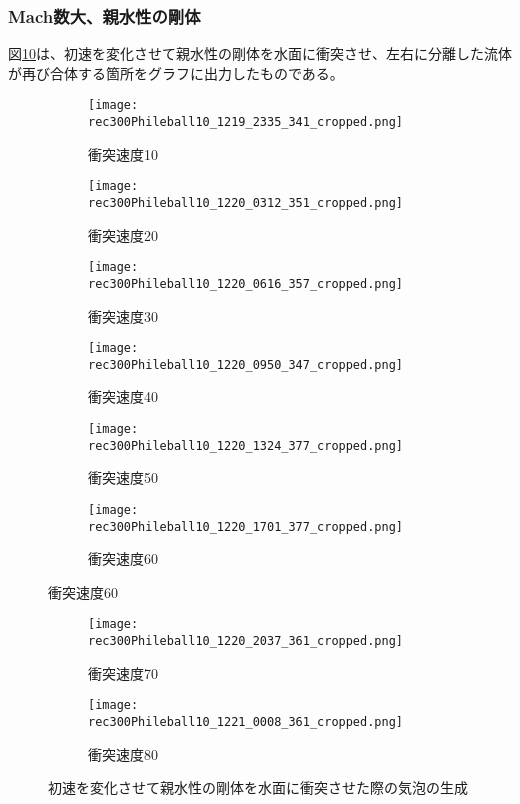 \documentclass[]{jsarticle}
\begin{document}
\subsubsection{Mach数大、親水性の剛体}
図\ref{fig:hydrophilic}は、初速を変化させて親水性の剛体を水面に衝突させ、左右に分離した流体が再び合体する箇所をグラフに出力したものである。
\begin{figure}[H]
  \centering
\begin{subfigure}{0.3\columnwidth}
  \centering
  \texttt{[image: rec300Phileball10\_1219\_2335\_341\_cropped.png]}
  \caption{衝突速度10}
  \label{fig:philevel10}
\end{subfigure}
\begin{subfigure}{0.3\columnwidth}
  \centering
  \texttt{[image: rec300Phileball10\_1220\_0312\_351\_cropped.png]}
  \caption{衝突速度20}
  \label{fig:philevel20}
\end{subfigure}
\begin{subfigure}{0.3\columnwidth}
  \centering
  \texttt{[image: rec300Phileball10\_1220\_0616\_357\_cropped.png]}
  \caption{衝突速度30}
  \label{fig:philevel30}
\end{subfigure}
\begin{subfigure}{0.3\columnwidth}
  \centering
  \texttt{[image: rec300Phileball10\_1220\_0950\_347\_cropped.png]}
  \caption{衝突速度40}
  \label{fig:philevel40}
\end{subfigure}
\begin{subfigure}{0.3\columnwidth}
  \centering
  \texttt{[image: rec300Phileball10\_1220\_1324\_377\_cropped.png]}
  \caption{衝突速度50}
  \label{fig:philevel50}
\end{subfigure}
\begin{subfigure}{0.3\columnwidth}
  \centering
  \texttt{[image: rec300Phileball10\_1220\_1701\_377\_cropped.png]}
  \caption{衝突速度60}
  \label{fig:philevel60}
\end{subfigure}
\end{figure}
\clearpage
\begin{figure}
\ContinuedFloat
  \begin{subfigure}{0.3\columnwidth}
  \centering
  \texttt{[image: rec300Phileball10\_1220\_2037\_361\_cropped.png]}
  \caption{衝突速度70}
  \label{fig:philevel70}
\end{subfigure}
\begin{subfigure}{0.3\columnwidth}
  \centering
  \texttt{[image: rec300Phileball10\_1221\_0008\_361\_cropped.png]}
  \caption{衝突速度80}
  \label{fig:philevel80}
\end{subfigure}
\caption{初速を変化させて親水性の剛体を水面に衝突させた際の気泡の生成}
\label{fig:hydrophilic}
\end{figure}
\end{document}
